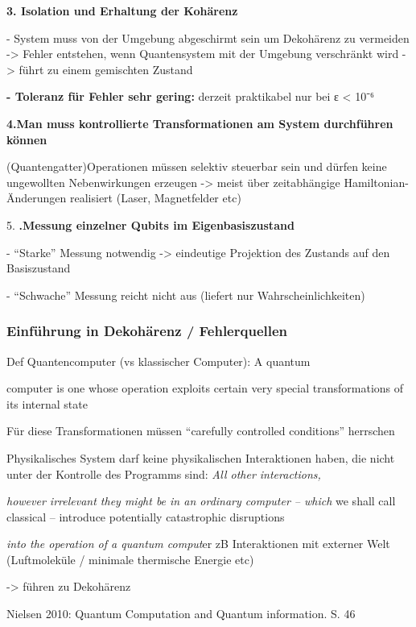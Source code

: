 \textbf{3. Isolation und Erhaltung der Kohärenz} 

- System muss von der Umgebung abgeschirmt sein um Dekohärenz zu vermeiden -> Fehler entstehen, wenn Quantensystem mit der Umgebung verschränkt wird -> führt zu einem gemischten Zustand 

\textbf{- Toleranz für Fehler sehr gering: }derzeit praktikabel nur bei ε < 10⁻⁶ 

\textbf{4.Man muss kontrollierte Transformationen am System durchführen können} 

(Quantengatter)Operationen müssen selektiv steuerbar sein und dürfen keine ungewollten Nebenwirkungen erzeugen -> meist über zeitabhängige Hamiltonian-Änderungen realisiert (Laser, Magnetfelder etc) 

5. \textbf{.Messung einzelner Qubits im Eigenbasiszustand} 

- “Starke” Messung notwendig -> eindeutige Projektion des Zustands auf den Basiszustand 

- “Schwache” Messung reicht nicht aus (liefert nur Wahrscheinlichkeiten) 

\cite{divincenzo_topics_nodate}
 
\subsubsection{Einführung in Dekohärenz / Fehlerquellen}

Def Quantencomputer (vs klassischer Computer): A quantum 

computer is one whose operation exploits certain very special transformations of its internal state 

Für diese Transformationen müssen “carefully controlled conditions” herrschen 

Physikalisches System darf keine physikalischen Interaktionen haben, die nicht unter der Kontrolle des Programms sind: \textit{All other interactions,} 

\textit{however irrelevant they might be in an ordinary computer – which} we shall call classical – introduce potentially catastrophic disruptions

\textit{into the operation of a quantum comput}er zB Interaktionen mit externer Welt (Luftmoleküle / minimale thermische Energie etc) 

-> führen zu Dekohärenz 
\cite{mermin_quantum_2012}
 

Nielsen 2010: Quantum Computation and Quantum information. S. 46 


